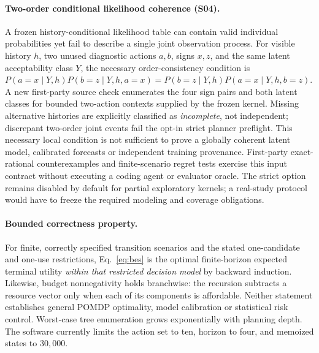 \documentclass[pdflatex,sn-basic]{sn-jnl}
\begin{document}
\paragraph{Two-order conditional likelihood coherence (S04).}
A frozen history-conditional likelihood table can contain
valid individual probabilities yet fail to describe a
single joint observation process. For visible history
$h$, two unused diagnostic actions $a,b$, signs $x,z$,
and the same latent acceptability class $Y$, the
necessary order-consistency condition is
$P(a{=}x\mid Y,h)P(b{=}z\mid Y,h,a{=}x)
=P(b{=}z\mid Y,h)P(a{=}x\mid Y,h,b{=}z)$.
A new first-party source check enumerates the four
sign pairs and both latent classes for bounded
two-action contexts supplied by the frozen kernel.
Missing alternative histories are explicitly classified
as \emph{incomplete}, not independent; discrepant
two-order joint events fail the opt-in strict planner
preflight. This necessary local condition is not
sufficient to prove a globally coherent latent model,
calibrated forecasts or independent training provenance.
First-party exact-rational counterexamples and
finite-scenario regret tests exercise this input contract
without executing a coding agent or evaluator oracle.
The strict option remains disabled by default for partial
exploratory kernels; a real-study protocol would have to
freeze the required modeling and coverage obligations.

\paragraph{Bounded correctness property.}
For finite, correctly specified transition scenarios and
the stated one-candidate and one-use restrictions,
Eq.~\eqref{eq:bes} is the optimal finite-horizon expected
terminal utility \emph{within that restricted decision model}
by backward induction. Likewise, budget nonnegativity
holds branchwise: the recursion subtracts a resource
vector only when each of its components is affordable.
Neither statement establishes general POMDP optimality,
model calibration or statistical risk control. Worst-case
tree enumeration grows exponentially with planning depth.
The software currently limits the action set to ten,
horizon to four, and memoized states to $30{,}000$.
\end{document}
